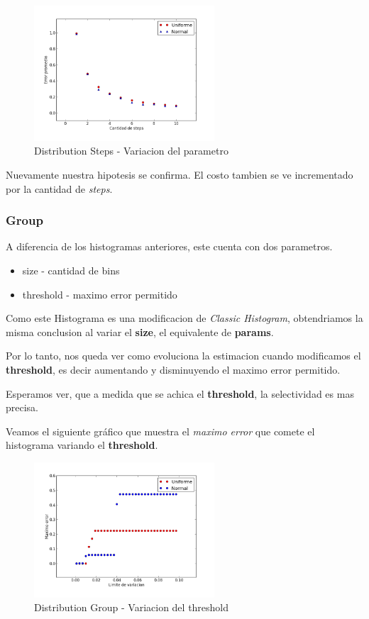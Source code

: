 \documentclass[10pt, a4paper,english,spanish,hidelinks]{article}
\begin{document}
\begin{figure}[h!]
  \centering
  \includegraphics[width=0.6\textwidth]{./imagenes/ejb2_step_parameter_variation.png}
  \caption{Distribution Steps - Variacion del parametro}
\end{figure}

Nuevamente nuestra hipotesis se confirma. El costo tambien se ve incrementado por
la cantidad de \textit{steps}.




\subsubsection{Group}

A diferencia de los histogramas anteriores, este cuenta con dos parametros.

\begin{itemize}
  \item size - cantidad de bins
  \item threshold - maximo error permitido
\end{itemize}

Como este Histograma es una modificacion de \textit{Classic Histogram}, obtendriamos la misma
conclusion al variar el \textbf{size}, el equivalente de \textbf{params}.

Por lo tanto, nos queda ver como evoluciona la estimacion cuando modificamos el
\textbf{threshold}, es decir aumentando y disminuyendo el maximo error permitido.

Esperamos ver, que a medida que se achica el \textbf{threshold}, la selectividad es mas precisa.


Veamos el siguiente gráfico que muestra el \textit{maximo error} que comete el histograma
variando el \textbf{threshold}.

\begin{figure}[h!]
  \centering
  \includegraphics[width=0.6\textwidth]{./imagenes/ejb2_group_parameter_variation.png}
  \caption{Distribution Group - Variacion del threshold}
\end{figure}
\end{document}

